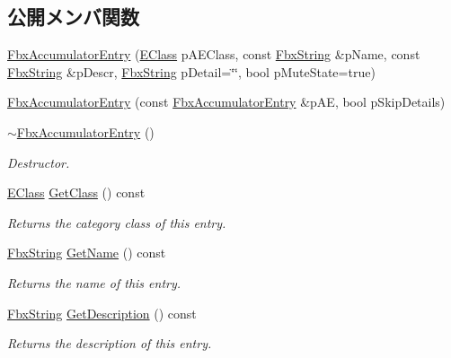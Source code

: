 \subsection*{公開メンバ関数}
\begin{DoxyCompactItemize}
\item 
\hyperlink{class_fbx_accumulator_entry_a08089894e3d5aed12dfc556553e022c4}{Fbx\+Accumulator\+Entry} (\hyperlink{class_fbx_accumulator_entry_af08af3ddcbf7e8fe642d7e9ecb4ad0e2}{E\+Class} p\+A\+E\+Class, const \hyperlink{class_fbx_string}{Fbx\+String} \&p\+Name, const \hyperlink{class_fbx_string}{Fbx\+String} \&p\+Descr, \hyperlink{class_fbx_string}{Fbx\+String} p\+Detail=\char`\"{}\char`\"{}, bool p\+Mute\+State=true)
\item 
\hyperlink{class_fbx_accumulator_entry_a536f3ab8a13cb7037e6f2a39278eb8ca}{Fbx\+Accumulator\+Entry} (const \hyperlink{class_fbx_accumulator_entry}{Fbx\+Accumulator\+Entry} \&p\+AE, bool p\+Skip\+Details)
\item 
\hyperlink{class_fbx_accumulator_entry_a76e1a283bd8e13c1591b83ed85cb5a10}{$\sim$\+Fbx\+Accumulator\+Entry} ()
\begin{DoxyCompactList}\small\item\em Destructor. \end{DoxyCompactList}\item 
\hyperlink{class_fbx_accumulator_entry_af08af3ddcbf7e8fe642d7e9ecb4ad0e2}{E\+Class} \hyperlink{class_fbx_accumulator_entry_a2c6baa9720f96ecf7a9cc69f89b5c430}{Get\+Class} () const
\begin{DoxyCompactList}\small\item\em Returns the category class of this entry. \end{DoxyCompactList}\item 
\hyperlink{class_fbx_string}{Fbx\+String} \hyperlink{class_fbx_accumulator_entry_a0dbcb9bc95c823b84a8679f781d35317}{Get\+Name} () const
\begin{DoxyCompactList}\small\item\em Returns the name of this entry. \end{DoxyCompactList}\item 
\hyperlink{class_fbx_string}{Fbx\+String} \hyperlink{class_fbx_accumulator_entry_a37cfbde3b74cda66945b948b4d6acd7c}{Get\+Description} () const
\begin{DoxyCompactList}\small\item\em Returns the description of this entry. \end{DoxyCompactList}\item 

\end{DoxyCompactItemize}
